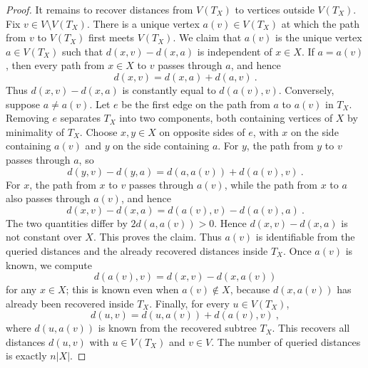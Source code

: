 \documentclass[10pt,a4paper]{amsart}
\begin{document}
\begin{proof}
It remains to recover distances from $V(T_X)$ to vertices outside $V(T_X)$. Fix $v\in V\setminus V(T_X)$. There is a unique vertex $a(v)\in V(T_X)$ at which the path from $v$ to $V(T_X)$ first meets $V(T_X)$. We claim that $a(v)$ is the unique vertex $a\in V(T_X)$ such that $d(x,v)-d(x,a)$ is independent of $x\in X$. If $a=a(v)$, then every path from $x\in X$ to $v$ passes through $a$, and hence
$$
d(x,v)=d(x,a)+d(a,v)~.
$$
Thus $d(x,v)-d(x,a)$ is constantly equal to $d(a(v),v)$. Conversely, suppose $a\neq a(v)$. Let $e$ be the first edge on the path from $a$ to $a(v)$ in $T_X$. Removing $e$ separates $T_X$ into two components, both containing vertices of $X$ by minimality of $T_X$. Choose $x,y\in X$ on opposite sides of $e$, with $x$ on the side containing $a(v)$ and $y$ on the side containing $a$. For $y$, the path from $y$ to $v$ passes through $a$, so
$$
d(y,v)-d(y,a)=d(a,a(v))+d(a(v),v)~.
$$
For $x$, the path from $x$ to $v$ passes through $a(v)$, while the path from $x$ to $a$ also passes through $a(v)$, and hence
$$
d(x,v)-d(x,a)=d(a(v),v)-d(a(v),a)~.
$$
The two quantities differ by $2d(a,a(v))>0$. Hence $d(x,v)-d(x,a)$ is not constant over $X$. This proves the claim. Thus $a(v)$ is identifiable from the queried distances and the already recovered distances inside $T_X$. Once $a(v)$ is known, we compute
$$
d(a(v),v)=d(x,v)-d(x,a(v))
$$
for any $x\in X$; this is known even when $a(v)\notin X$, because $d(x,a(v))$ has already been recovered inside $T_X$. Finally, for every $u\in V(T_X)$,
$$
d(u,v)=d(u,a(v))+d(a(v),v)~,
$$
where $d(u,a(v))$ is known from the recovered subtree $T_X$. This recovers all distances $d(u,v)$ with $u\in V(T_X)$ and $v\in V$. The number of queried distances is exactly $n|X|$.
 \end{proof}
\end{document}

